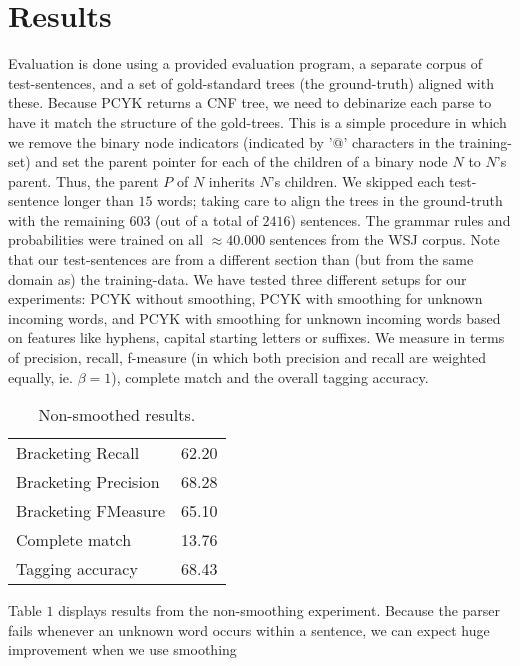 \documentclass[11pt,twocolumn]{article}
\begin{document}
	\section{Results}\label{sec:results}
		Evaluation is done using a provided evaluation program, a separate corpus of test-sentences,
		and a set of gold-standard trees (the ground-truth) aligned with these. Because PCYK returns
		a CNF tree, we need to debinarize each parse to have it match the structure of the gold-trees.
		This is a simple procedure in which we remove the binary node indicators (indicated by '@'
		characters in the training-set) and set the parent pointer for each of the children of a binary
		node $N$ to $N$'s parent. Thus, the parent $P$ of $N$ inherits $N$'s children. We skipped each
		test-sentence longer than $15$ words; taking care to align the trees in the ground-truth with the
		remaining $603$ (out of a total of $2416$) sentences. The grammar rules and probabilities were
		trained on all $\approx 40.000$ sentences from the WSJ corpus. Note that our test-sentences are
		from a different section than (but from the same domain as) the training-data. We have tested
		three different setups for our experiments: PCYK without smoothing, PCYK with smoothing for
		unknown incoming words, and PCYK with smoothing for unknown incoming words based on features
		like hyphens, capital starting letters or suffixes. We measure in terms of precision, recall,
		f-measure (in which both precision and recall are weighted equally, ie. $\beta=1$), complete
		match and the overall tagging accuracy.
		\begin{table}[H] %
			\begin{center}
				\begin{tabular}{|l|r|}
					\hline
					Bracketing Recall         &  62.20 \\
					Bracketing Precision      &  68.28 \\
					Bracketing FMeasure       &  65.10 \\
					Complete match            &  13.76 \\
					Tagging accuracy          &  68.43 \\
					\hline
				\end{tabular}
				\caption{Non-smoothed results.}
			\end{center}
			\label{table:table1}
		\end{table}        
		\noindent
		Table $1$ displays results from the non-smoothing experiment. Because the parser fails whenever
		an unknown word occurs within a sentence, we can expect huge improvement when we use smoothing
\end{document}
